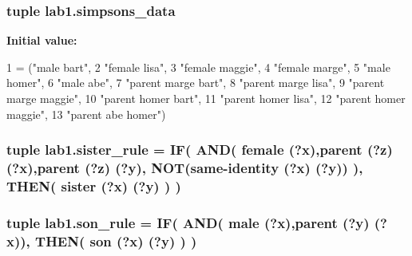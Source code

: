 \subsubsection[{simpsons\+\_\+data}]{\setlength{\rightskip}{0pt plus 5cm}tuple lab1.\+simpsons\+\_\+data}\label{namespacelab1_af339432da6bd451c07808024dae9fc1b}
{\bfseries Initial value\+:}
\begin{DoxyCode}
1 = (\textcolor{stringliteral}{"male bart"},
2                  \textcolor{stringliteral}{"female lisa"},
3                  \textcolor{stringliteral}{"female maggie"},
4                  \textcolor{stringliteral}{"female marge"},
5                  \textcolor{stringliteral}{"male homer"},
6                  \textcolor{stringliteral}{"male abe"},
7                  \textcolor{stringliteral}{"parent marge bart"},
8                  \textcolor{stringliteral}{"parent marge lisa"},
9                  \textcolor{stringliteral}{"parent marge maggie"},
10                  \textcolor{stringliteral}{"parent homer bart"},
11                  \textcolor{stringliteral}{"parent homer lisa"},
12                  \textcolor{stringliteral}{"parent homer maggie"},
13                  \textcolor{stringliteral}{"parent abe homer"})
\end{DoxyCode}
\hypertarget{namespacelab1_af4f117ff665235f6bade3d725b728f59}{}
\subsubsection[{sister\+\_\+rule}]{\setlength{\rightskip}{0pt plus 5cm}tuple lab1.\+sister\+\_\+rule = {\bf I\+F}( {\bf A\+N\+D}( \textquotesingle{}female (?x)\textquotesingle{},\textquotesingle{}parent (?z) (?x)\textquotesingle{},\textquotesingle{}parent (?z) (?y)\textquotesingle{}, {\bf N\+O\+T}(\textquotesingle{}same-\/identity (?x) (?y)\textquotesingle{}) ), {\bf T\+H\+E\+N}( \textquotesingle{}sister (?x) (?y)\textquotesingle{} ) )}\label{namespacelab1_af4f117ff665235f6bade3d725b728f59}
\hypertarget{namespacelab1_a2a1ea2c1c23fef0cfcd295caf1235fc0}{}
\subsubsection[{son\+\_\+rule}]{\setlength{\rightskip}{0pt plus 5cm}tuple lab1.\+son\+\_\+rule = {\bf I\+F}( {\bf A\+N\+D}( \textquotesingle{}male (?x)\textquotesingle{},\textquotesingle{}parent (?y) (?x)\textquotesingle{}), {\bf T\+H\+E\+N}( \textquotesingle{}son (?x) (?y)\textquotesingle{} ) )}\label{namespacelab1_a2a1ea2c1c23fef0cfcd295caf1235fc0}
\hypertarget{namespacelab1_aed2d020dbfee204727220a36741309e5}{}

